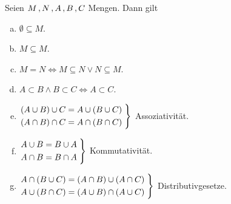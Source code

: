 \documentclass[../ana1.tex]{subfiles}
\begin{document}
\begin{bem} Seien \(M\operatorname{,} N\operatorname{,} A\operatorname{,} B\operatorname{,} C\) Mengen. Dann gilt
	\begin{enumerate}[(a)]
		\item \(\emptyset \subseteq M\).
		\item \(M \subseteq M\).
		\item \(M = N \iff M \subseteq N \vee N \subseteq M\).
		\item \(A\subset B \wedge B \subset C \iff A \subset C\).
		\item \(\begin{rcases*}
					(A\cup B) \cup C = A \cup (B \cup C)\;\\
					(A\cap B) \cap C = A \cap (B \cap C)\;
			    \end{rcases*}\) Assoziativität.
		\item \(\begin{rcases*}
			    	A\cup B = B \cup A\;\\
		        	A\cap B = B \cap A\;
			    \end{rcases*}\) Kommutativität.
		\item \(\begin{rcases*}
			    	A \cap (B\cup C) = (A\cap B) \cup (A\cap C)\;\\
			    	A \cup (B\cap C) = (A\cup B) \cap (A\cup C)\;
			    \end{rcases*}\) Distributivgesetze.
	\end{enumerate}
\end{bem}
\end{document}
